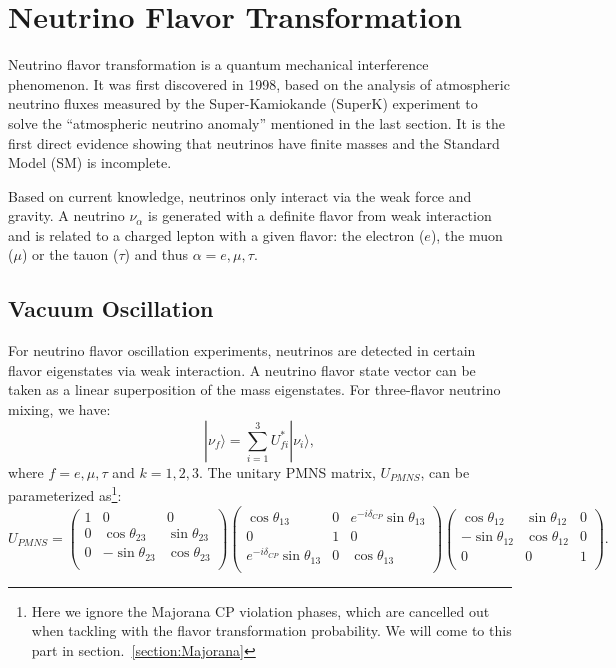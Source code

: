\section{Neutrino Flavor Transformation}
Neutrino flavor transformation is a quantum mechanical interference phenomenon\cite{akhmedov2019quantum}. It was first discovered in 1998, based on the analysis of atmospheric neutrino fluxes measured by the Super-Kamiokande (SuperK) experiment to solve the ``atmospheric neutrino anomaly'' mentioned in the last section\cite{fukuda1998evidence}. It is the first direct evidence showing that neutrinos have finite masses and the Standard Model (SM) is incomplete.

Based on current knowledge, neutrinos only interact via the weak force and gravity. A neutrino $\nu_\alpha$ is generated with a definite flavor from weak interaction and is related to a charged lepton with a given flavor: the electron ($e$), the muon ($\mu$) or the tauon ($\tau$) and thus $\alpha=e,\mu,\tau$.

\subsection{Vacuum Oscillation}\label{sectVacuumOsci}
For neutrino flavor oscillation experiments, neutrinos are detected in certain flavor eigenstates via weak interaction. A neutrino flavor state vector can be taken as a linear superposition of the mass eigenstates. For three-flavor neutrino mixing, we have\cite{pdg2018}:
\begin{equation}\label{eq:mixingmatrix}
|\nu_f\rangle = \sum_{i=1}^3U^*_{fi}|\nu_i\rangle, 
\end{equation}
where $f=e,\mu,\tau$ and $k=1,2,3$. The unitary PMNS matrix, $U_{PMNS}$, can be parameterized as\footnote{Here we ignore the Majorana CP violation phases, which are cancelled out when tackling with the flavor transformation probability. We will come to this part in section.~\ref{section:Majorana}}: 
\begin{equation}\label{eq:uPMNS}
U_{PMNS} =
\begin{pmatrix}
1 &0 &0\\
0 &\cos\theta_{23} &\sin\theta_{23}\\
0 &-\sin\theta_{23} &\cos\theta_{23}\\ 
\end{pmatrix}
\begin{pmatrix}
\cos\theta_{13} &0 &e^{-i\delta_{CP}}\sin\theta_{13}\\
0 &1 &0\\
e^{-i\delta_{CP}}\sin\theta_{13} &0 &\cos\theta_{13}\\ 
\end{pmatrix}
\begin{pmatrix}
\cos\theta_{12} &\sin\theta_{12} &0\\
-\sin\theta_{12} &\cos\theta_{12} &0\\
0 &0 &1\\ 
\end{pmatrix}.
\end{equation}

